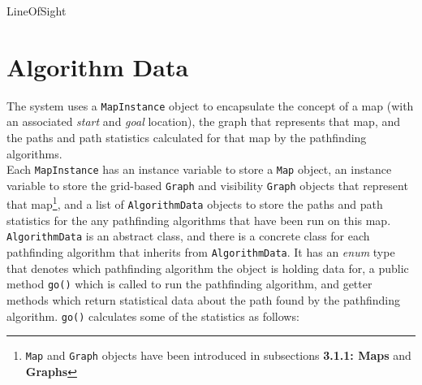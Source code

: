 \documentclass[12pt,notitlepage]{report}
\begin{document}
\begin{algorithm}
  \SetAlgoLined\DontPrintSemicolon
  \caption{{\sc LineOfSight}}
\end{algorithm} 

\section{Algorithm Data}
The system uses a {\tt MapInstance} object to encapsulate the concept of a map (with an associated {\em start} and {\em goal} location), the graph that represents that map, and the paths and path statistics calculated for that map by the pathfinding algorithms.\\

\noindent
Each {\tt MapInstance} has an instance variable to store a {\tt Map} object, an instance variable to store the grid-based {\tt Graph} and visibility {\tt Graph} objects that represent that map\footnote{{\tt Map} and {\tt Graph} objects have been introduced in subsections {\bfseries 3.1.1: Maps} and {\bfseries Graphs}}, and a list of {\tt AlgorithmData} objects to store the paths and path statistics for the any pathfinding algorithms that have been run on this map.\\

\noindent
{\tt AlgorithmData} is an abstract class, and there is a concrete class for each pathfinding algorithm that inherits from {\tt AlgorithmData}. It has an {\em enum} type that denotes which pathfinding algorithm the object is holding data for, a public method {\tt go()} which is called to run the pathfinding algorithm, and getter methods which return statistical data about the path found by the pathfinding algorithm. {\tt go()} calculates some of the statistics as follows:
\end{document}
